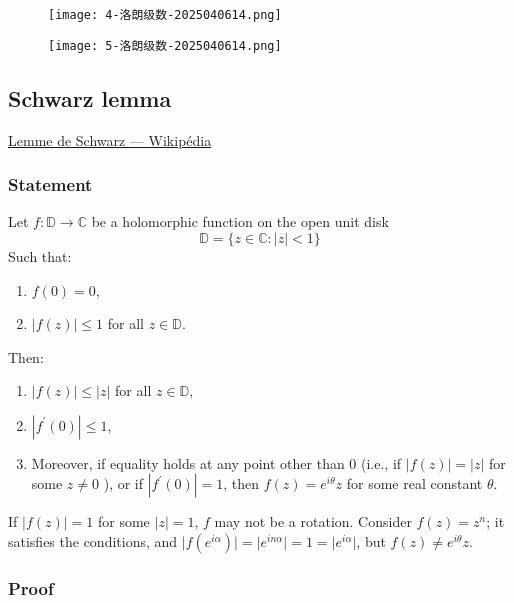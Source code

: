 \begin{figure}[H]
\centering
\texttt{[image: 4-洛朗级数-2025040614.png]}
\label{}
\end{figure}
\begin{figure}[H]
\centering
\texttt{[image: 5-洛朗级数-2025040614.png]}
\label{}
\end{figure}

\subsection{Schwarz lemma}

\href{https://fr.wikipedia.org/wiki/Lemme_de_Schwarz#Preuve}{Lemme de Schwarz — Wikipédia}

\subsubsection{Statement}

Let $f: \mathbb{D} \rightarrow \mathbb{C}$ be a holomorphic function on the open unit disk
\[
\mathbb{D}=\{z \in \mathbb{C}:|z|<1\}
\]
Such that:

\begin{enumerate}
	\item $f(0)=0$,
	\item $|f(z)| \leq 1$ for all $z \in \mathbb{D}$.
\end{enumerate}

Then:

\begin{enumerate}
	\item $|f(z)| \leq|z|$ for all $z \in \mathbb{D}$,
	\item $\left|f^{\prime}(0)\right| \leq 1$,
	\item Moreover, if equality holds at any point other than 0 (i.e., if $|f(z)|=|z|$ for some $z \neq 0$ ), or if $\left|f^{\prime}(0)\right|=1$, then $f(z)=e^{i \theta} z$ for some real constant $\theta$.
\end{enumerate}

\begin{note}
If $\lvert f(z) \rvert=1$ for some $\lvert z \rvert=1$, $f$ may not be a rotation. Consider $f(z)=z^{n}$; it satisfies the conditions, and $\lvert f(e^{ i\alpha }) \rvert=\lvert e^{ in\alpha } \rvert=1=\lvert e^{ i\alpha } \rvert$, but $f(z)\neq e^{ i\theta }z$.
\end{note}
\subsubsection{Proof}

